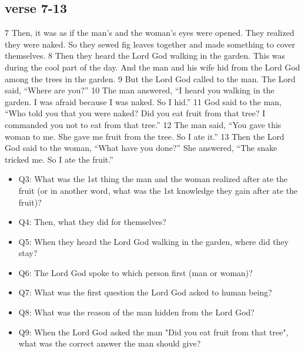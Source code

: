 \subsection{verse 7-13}
\large{7 Then, it was as if the man’s and the woman’s eyes were opened. They realized they were naked. So they sewed fig leaves together and made something to cover themselves. 8 Then they heard the Lord God walking in the garden. This was during the cool part of the day. And the man and his wife hid from the Lord God among the trees in the garden. 9 But the Lord God called to the man. The Lord said, “Where are you?” 10 The man answered, “I heard you walking in the garden. I was afraid because I was naked. So I hid.” 11 God said to the man, “Who told you that you were naked? Did you eat fruit from that tree? I commanded you not to eat from that tree.” 12 The man said, “You gave this woman to me. She gave me fruit from the tree. So I ate it.”
13 Then the Lord God said to the woman, “What have you done?” She answered, “The snake tricked me. So I ate the fruit.”}

\begin{itemize}
\item Q3: What was the 1st thing the man and the woman realized after ate the fruit (or in another word, what was the 1st knowledge they gain after ate the fruit)?
\item Q4: Then, what they did for themselves?
\item Q5: When they heard the Lord God walking in the garden, where did they stay?
\item Q6: The Lord God spoke to which person first (man or woman)?
\item Q7: What was the first question the Lord God asked to human being?
\item Q8: What was the reason of the man hidden from the Lord God?
\item Q9: When the Lord God asked the man "Did you eat fruit from that tree", what was the correct answer the man should give? 
\end{itemize}


